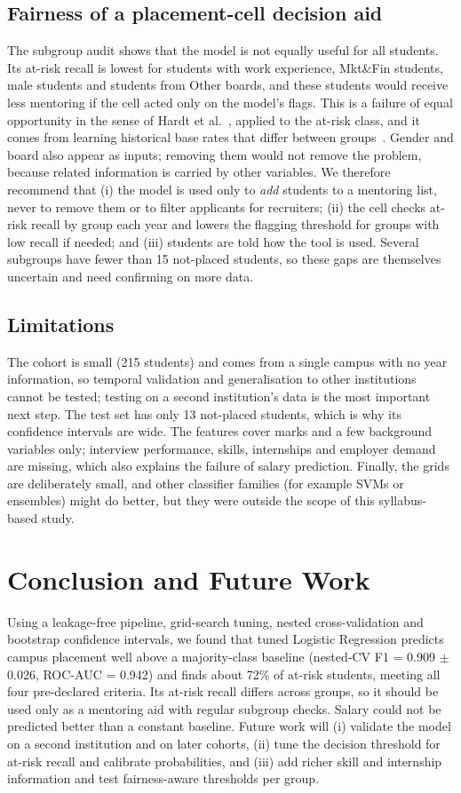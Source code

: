 \documentclass[runningheads]{llncs}
\begin{document}
\subsection{Fairness of a placement-cell decision aid}
The subgroup audit shows that the model is not equally useful for all students. Its at-risk recall is lowest for students with work experience, Mkt\&Fin students, male students and students from Other boards, and these students would receive less mentoring if the cell acted only on the model's flags. This is a failure of equal opportunity in the sense of Hardt et al.~\cite{hardt}, applied to the at-risk class, and it comes from learning historical base rates that differ between groups~\cite{mehrabi}. Gender and board also appear as inputs; removing them would not remove the problem, because related information is carried by other variables. We therefore recommend that (i) the model is used only to \emph{add} students to a mentoring list, never to remove them or to filter applicants for recruiters; (ii) the cell checks at-risk recall by group each year and lowers the flagging threshold for groups with low recall if needed; and (iii) students are told how the tool is used. Several subgroups have fewer than 15 not-placed students, so these gaps are themselves uncertain and need confirming on more data.

\subsection{Limitations}
The cohort is small (215 students) and comes from a single campus with no year information, so temporal validation and generalisation to other institutions cannot be tested; testing on a second institution's data is the most important next step. The test set has only 13 not-placed students, which is why its confidence intervals are wide. The features cover marks and a few background variables only; interview performance, skills, internships and employer demand are missing, which also explains the failure of salary prediction. Finally, the grids are deliberately small, and other classifier families (for example SVMs or ensembles) might do better, but they were outside the scope of this syllabus-based study.

\section{Conclusion and Future Work}\label{sec:conclusion}
Using a leakage-free pipeline, grid-search tuning, nested cross-validation and bootstrap confidence intervals, we found that tuned Logistic Regression predicts campus placement well above a majority-class baseline (nested-CV F1 = 0.909 $\pm$ 0.026, ROC-AUC = 0.942) and finds about 72\% of at-risk students, meeting all four pre-declared criteria. Its at-risk recall differs across groups, so it should be used only as a mentoring aid with regular subgroup checks. Salary could not be predicted better than a constant baseline. Future work will (i) validate the model on a second institution and on later cohorts, (ii) tune the decision threshold for at-risk recall and calibrate probabilities, and (iii) add richer skill and internship information and test fairness-aware thresholds per group.
\end{document}
